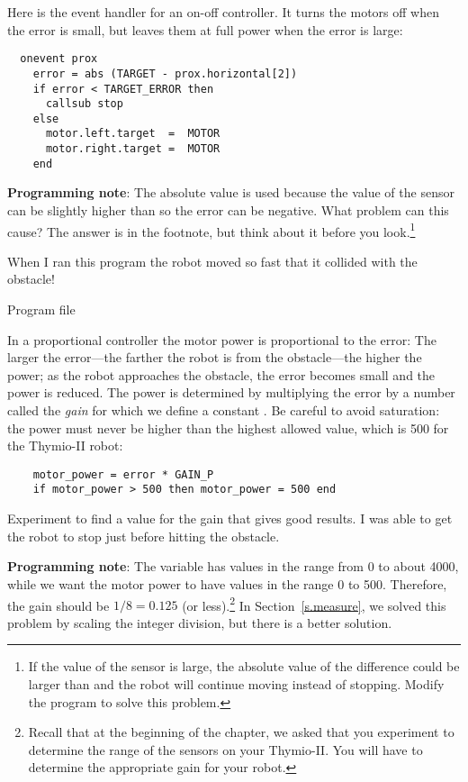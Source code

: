 Here is the event handler for an on-off controller. It turns the motors
off when the error is small, but leaves them at full power when the
error is large:

\begin{verbatim}
  onevent prox
    error = abs (TARGET - prox.horizontal[2])
    if error < TARGET_ERROR then
      callsub stop
    else
      motor.left.target  =  MOTOR
      motor.right.target =  MOTOR
    end
\end{verbatim}

\textbf{Programming note}: The absolute value is used because the value
of the sensor can be slightly higher than  so the error can be
negative. What problem can this cause? The answer is in the footnote,
but think about it before you look.\footnote{If the value of the sensor
is large, the absolute value of the difference could be larger than
 and the robot will continue moving instead of
stopping. Modify the program to solve this problem.}

When I ran this program the robot moved so fast that it collided with
the obstacle!


{\raggedleft \hfill Program file }

In a proportional controller the motor power is proportional to the
error: The larger the error---the farther the robot is from the
obstacle---the higher the power; as the robot approaches the obstacle,
the error becomes small and the power is reduced. The power is
determined by multiplying the error by a number called the \emph{gain}
for which we define a constant . Be careful to avoid
saturation: the power must never be higher than the highest allowed
value, which is 500 for the Thymio-II robot:

\begin{verbatim}
    motor_power = error * GAIN_P
    if motor_power > 500 then motor_power = 500 end
\end{verbatim}

Experiment to find a value for the gain that gives good results. I was
able to get the robot to stop just before hitting the obstacle.

\textbf{Programming note}: The variable  has values in the
range from 0 to about 4000, while we want the motor power to have values
in the range 0 to 500. Therefore, the gain should be $1/8 = 0.125$ (or
less).\footnote{Recall that at the beginning of the chapter, we asked
that you experiment to determine the range of the sensors on your
Thymio-II. You will have to determine the appropriate gain for your
robot.} In Section~\ref{s.measure}, we solved this problem by scaling
the integer division, but there is a better solution.

